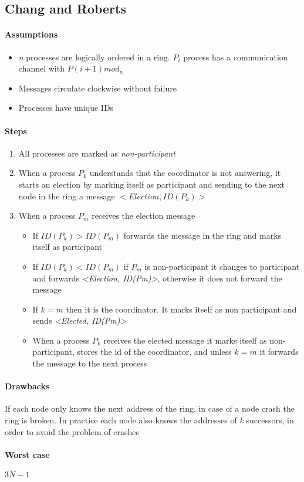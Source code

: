 \subsection{Chang and Roberts}
\paragraph{Assumptions}
\begin{itemize}
    \item \textit{n} processes are logically ordered in a ring. $P_i$ process has a communication channel with $P(i+1)mod_n$
    \item Messages circulate clockwise without failure
    \item Processes have unique IDs
\end{itemize}

\paragraph{Steps}
\begin{enumerate}
    \item All processes are marked as \textit{non-participant}
    \item When a process $P_k$ understands that the coordinator is not answering, it starts an election by marking itself as participant and sending to the next node in the ring a message $<Election, ID(P_k)>$
    \item When a process $P_m$ receives the election message
    \begin{itemize}
        \item If $ID(P_k) > ID(P_m)$ forwards the message in the ring and marks itself as participant
        \item If $ID(P_k) < ID(P_m)$ if $P_m$ is non-participant it changes to participant and forwards \textit{<Election, ID(Pm)>}, otherwise it does not forward the message
        \item If $k=m$ then it is the coordinator. It marks itself as non participant and sends \textit{<Elected, ID(Pm)>}
        \item When a process $P_k$ receives the elected message it marks itself as non-participant, stores the id of the coordinator, and unless $k=m$ it forwards the message to the next process
    \end{itemize}
\end{enumerate}

\paragraph{Drawbacks}
If each node only knows the next address of the ring, in case of a node crash the ring is broken. In practice each node also knows the addresses of \textit{k} successors, in order to avoid the problem of crashes

\paragraph{Worst case} $3N-1$

\newpage